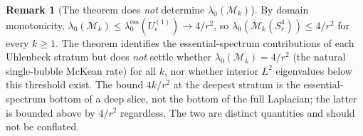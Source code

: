 \documentclass[11pt,letterpaper]{article}
\theoremstyle{definition}
\newtheorem{remark}[theorem]{Remark}
\newcommand{\cM}{\mathcal{M}}
\begin{document}
\begin{remark}[The theorem does \emph{not} determine $\lambda_0(\cM_k)$]\label{rmk:not-global-bottom}
By domain monotonicity, $\lambda_0(\cM_k) \le \lambda_0^{\mathrm{ess}}(U_\epsilon^{(1)}) \to 4/r^2$, so $\lambda_0(\cM_k(S^4_r)) \le 4/r^2$ for every $k \ge 1$. The theorem identifies the essential-spectrum contributions of each Uhlenbeck stratum but does \emph{not} settle whether $\lambda_0(\cM_k) = 4/r^2$ (the natural single-bubble McKean rate) for all $k$, nor whether interior $L^2$ eigenvalues below this threshold exist. The bound $4k/r^2$ at the deepest stratum is the essential-spectrum bottom of a deep slice, not the bottom of the full Laplacian; the latter is bounded above by $4/r^2$ regardless. The two are distinct quantities and should not be conflated.
\end{remark}
\end{document}
